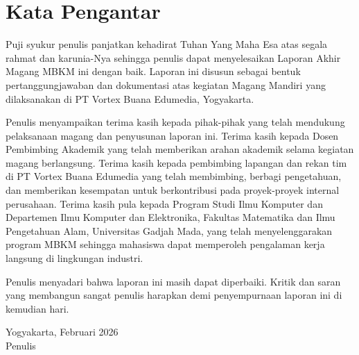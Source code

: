 \chapter*{Kata Pengantar}

Puji syukur penulis panjatkan kehadirat Tuhan Yang Maha Esa atas segala rahmat dan karunia-Nya sehingga penulis dapat menyelesaikan Laporan Akhir Magang MBKM ini dengan baik. Laporan ini disusun sebagai bentuk pertanggungjawaban dan dokumentasi atas kegiatan Magang Mandiri yang dilaksanakan di PT Vortex Buana Edumedia, Yogyakarta.

Penulis menyampaikan terima kasih kepada pihak-pihak yang telah mendukung pelaksanaan magang dan penyusunan laporan ini. Terima kasih kepada Dosen Pembimbing Akademik yang telah memberikan arahan akademik selama kegiatan magang berlangsung. Terima kasih kepada pembimbing lapangan dan rekan tim di PT Vortex Buana Edumedia yang telah membimbing, berbagi pengetahuan, dan memberikan kesempatan untuk berkontribusi pada proyek-proyek internal perusahaan. Terima kasih pula kepada Program Studi Ilmu Komputer dan Departemen Ilmu Komputer dan Elektronika, Fakultas Matematika dan Ilmu Pengetahuan Alam, Universitas Gadjah Mada, yang telah menyelenggarakan program MBKM sehingga mahasiswa dapat memperoleh pengalaman kerja langsung di lingkungan industri.

Penulis menyadari bahwa laporan ini masih dapat diperbaiki. Kritik dan saran yang membangun sangat penulis harapkan demi penyempurnaan laporan ini di kemudian hari.

\vspace{1.5cm}
\begin{flushright}
Yogyakarta, Februari 2026\\[1.5cm]
Penulis
\end{flushright}